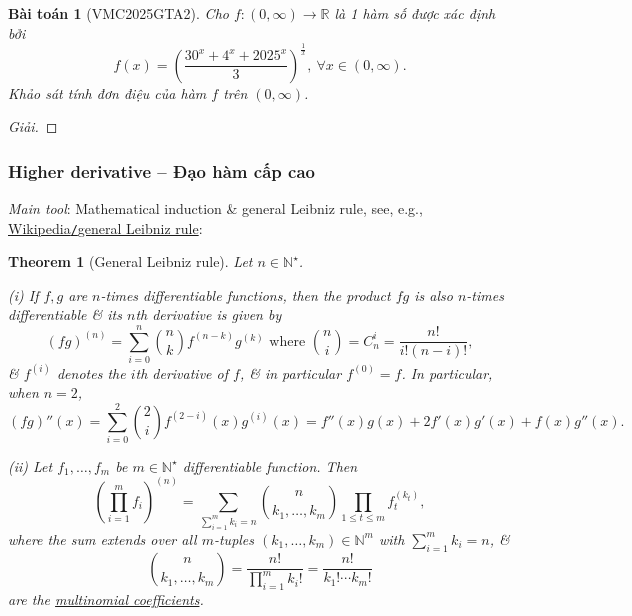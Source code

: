\documentclass{article}
\newtheorem{baitoan}{Bài toán}
\newtheorem{theorem}{Theorem}
\begin{document}
\begin{baitoan}[VMC2025GTA2]
	Cho $f:(0,\infty)\to\mathbb{R}$ là 1 hàm số được xác định bởi
	\begin{equation*}
		f(x) = \left(\frac{30^x + 4^x + 2025^x}{3}\right)^{\frac{1}{x}},\ \forall x\in(0,\infty).
	\end{equation*}
	Khảo sát tính đơn điệu của hàm $f$ trên $(0,\infty)$.
\end{baitoan}

\begin{proof}[Giải]
	
\end{proof}



\subsubsection{Higher derivative -- Đạo hàm cấp cao}
{\it Main tool}: Mathematical induction \& general Leibniz rule, see, e.g., \href{https://en.wikipedia.org/wiki/General_Leibniz_rule}{Wikipedia{\tt/}general Leibniz rule}:

\begin{theorem}[General Leibniz rule]
	Let $n\in\mathbb{N}^\star$.
	\item(i) If $f,g$ are $n$-times differentiable functions, then the product $fg$ is also $n$-times differentiable \& its $n$th derivative is given by
	\begin{equation*}
		(fg)^{(n)} = \sum_{i=0}^n \binom{n}{k}f^{(n-k)}g^{(k)}\mbox{ where }\binom{n}{i} = C_n^i = \frac{n!}{i!(n - i)!},
	\end{equation*}
	\& $f^{(i)}$ denotes the $i$th derivative of $f$, \& in particular $f^{(0)} = f$. In particular, when $n = 2$,
	\begin{equation*}
		(fg)''(x) = \sum_{i=0}^2 \binom{2}{i}f^{(2-i)}(x)g^{(i)}(x) = f''(x)g(x) + 2f'(x)g'(x) + f(x)g''(x).
	\end{equation*}
	\item(ii) Let $f_1,\ldots,f_m$ be $m\in\mathbb{N}^\star$ differentiable function. Then
	\begin{equation*}
		\left(\prod_{i=1}^m f_i\right)^{(n)} = \sum_{\sum_{i=1}^m k_i = n} \binom{n}{k_1,\ldots,k_m}\prod_{1\le t\le m} f_t^{(k_t)},
	\end{equation*}
	where the sum extends over all $m$-tuples $(k_1,\ldots,k_m)\in\mathbb{N}^m$ with $\sum_{i=1}^m k_i = n$, \&
	\begin{equation*}
		\binom{n}{k_1,\ldots,k_m} = \frac{n!}{\prod_{i=1}^m k_i!} = \frac{n!}{k_1!\cdots k_m!}
	\end{equation*}
	are the \href{https://en.wikipedia.org/wiki/Multinomial_coefficient}{multinomial coefficients}.
\end{theorem}
\end{document}
